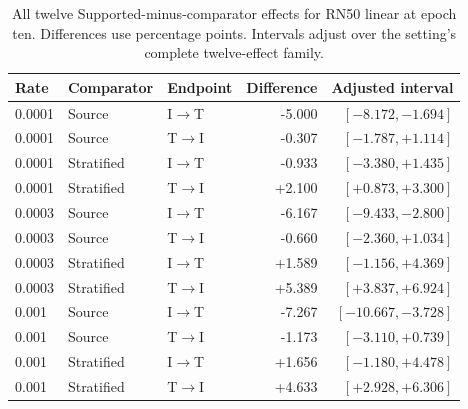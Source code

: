 \begin{table}[t]
\centering
\small
\setlength{\tabcolsep}{3pt}
\begin{tabular}{lllrr}
\toprule
Rate & Comparator & Endpoint & Difference & Adjusted interval\\
\midrule
0.0001 & Source & I$\to$T & -5.000 & $[-8.172,-1.694]$ \\
0.0001 & Source & T$\to$I & -0.307 & $[-1.787,+1.114]$ \\
0.0001 & Stratified & I$\to$T & -0.933 & $[-3.380,+1.435]$ \\
0.0001 & Stratified & T$\to$I & +2.100 & $[+0.873,+3.300]$ \\
0.0003 & Source & I$\to$T & -6.167 & $[-9.433,-2.800]$ \\
0.0003 & Source & T$\to$I & -0.660 & $[-2.360,+1.034]$ \\
0.0003 & Stratified & I$\to$T & +1.589 & $[-1.156,+4.369]$ \\
0.0003 & Stratified & T$\to$I & +5.389 & $[+3.837,+6.924]$ \\
0.001 & Source & I$\to$T & -7.267 & $[-10.667,-3.728]$ \\
0.001 & Source & T$\to$I & -1.173 & $[-3.110,+0.739]$ \\
0.001 & Stratified & I$\to$T & +1.656 & $[-1.180,+4.478]$ \\
0.001 & Stratified & T$\to$I & +4.633 & $[+2.928,+6.306]$ \\
\bottomrule
\end{tabular}
\caption{All twelve Supported-minus-comparator effects for RN50 linear at epoch ten. Differences use percentage points. Intervals adjust over the setting's complete twelve-effect family.}\label{tab:rn50partial}
\end{table}
